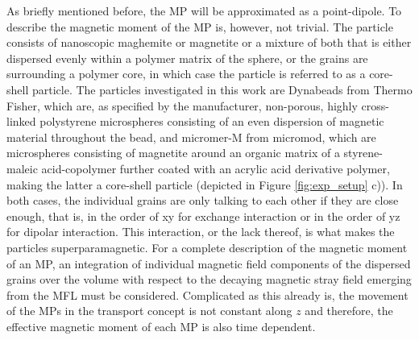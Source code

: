 As briefly mentioned before, the \ac{MP} will be approximated as a point-dipole.
To describe the magnetic moment of the \ac{MP} is, however, not trivial.
The particle consists of nanoscopic maghemite or magnetite or a mixture of both that is either dispersed evenly within a polymer matrix of the sphere, or the grains are surrounding a polymer core, in which case the particle is referred to as a core-shell particle. 
The particles investigated in this work are Dynabeads from Thermo Fisher, which are, as specified by the manufacturer, non-porous, highly cross-linked polystyrene microspheres consisting of an even dispersion of magnetic material throughout the bead, and micromer-M from micromod, which are microspheres consisting of magnetite around an organic matrix of a styrene-maleic acid-copolymer further coated with an acrylic acid derivative polymer\cite{Shubbak2026}, making the latter a core-shell particle (depicted in Figure \ref{fig:exp_setup} c)).
In both cases, the individual grains are only talking to each other if they are close enough, that is, in the order of xy for exchange interaction or in the order of yz for dipolar interaction. 
This interaction, or the lack thereof, is what makes the particles superparamagnetic. 
For a complete description of the magnetic moment of an \ac{MP}, an integration of individual magnetic field components of the dispersed grains over the volume with respect to the decaying magnetic stray field emerging from the \ac{MFL} must be considered.  
Complicated as this already is, the movement of the \acp{MP} in the transport concept is not constant along $z$ \cite{Huhnstock2022} and therefore, the effective magnetic moment of each \ac{MP} is also time dependent.


